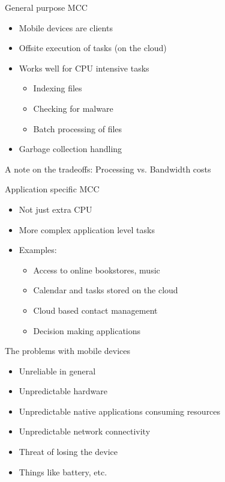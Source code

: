 \documentclass{beamer}
\begin{document}
\begin{frame}{General purpose MCC}
\begin{itemize}
 \item Mobile devices are clients
 \pause
 \item Offsite execution of tasks (on the cloud)
 \pause
 \item Works well for CPU intensive tasks
 \begin{itemize}
  \item Indexing files
  \item Checking for malware
  \item Batch processing of files
 \end{itemize}
 \pause
 \item Garbage collection handling
\end{itemize}
\pause
A note on the tradeoffs: Processing vs. Bandwidth costs
\end{frame}

\begin{frame}{Application specific MCC}
\begin{itemize}
 \item Not just extra CPU
 \pause
 \item More complex application level tasks
 \pause
 \item Examples:
 \begin{itemize}
  \item Access to online bookstores, music
  \item Calendar and tasks stored on the cloud
  \item Cloud based contact management
  \item Decision making applications
 \end{itemize}
\end{itemize}
\end{frame}

\begin{frame}{The problems with mobile devices}
\begin{itemize}
 \item Unreliable in general
 \pause
 \item Unpredictable hardware
 \pause
 \item Unpredictable native applications consuming resources
 \pause
 \item Unpredictable network connectivity
 \pause
 \item Threat of losing the device
 \pause
 \item Things like battery, etc.
\end{itemize}
\end{frame}
\end{document}
